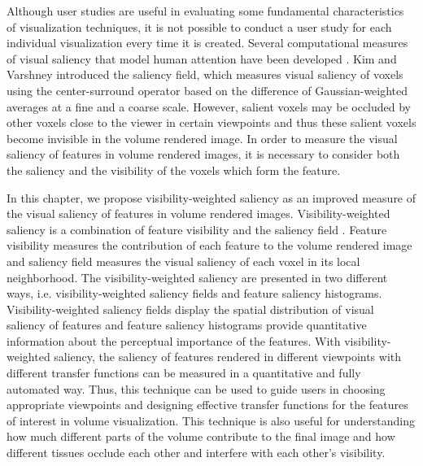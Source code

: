Although user studies are useful in evaluating some fundamental characteristics of visualization techniques, it is not possible to conduct a user study for each individual visualization every time it is created.
Several computational measures of visual saliency that model human attention have been developed \cite{itti_model_1998} \cite{harel_graph-based_2006}.
Kim and Varshney \cite{kim_saliency-guided_2006} introduced the saliency field, which measures visual saliency of voxels using the center-surround operator based on the difference of Gaussian-weighted averages at a fine and a coarse scale.
However, salient voxels may be occluded by other voxels close to the viewer in certain viewpoints and thus these salient voxels become invisible in the volume rendered image. In order to measure the visual saliency of features in volume rendered images, it is necessary to consider both the saliency and the visibility of the voxels which form the feature.

In this chapter, we propose visibility-weighted saliency as an improved measure of the visual saliency of features in volume rendered images. Visibility-weighted saliency is a combination of feature visibility \cite{wang_efficient_2011} and the saliency field \cite{kim_saliency-guided_2006}.
Feature visibility measures the contribution of each feature to the volume rendered image and saliency field measures the visual saliency of each voxel in its local neighborhood.
The visibility-weighted saliency are presented in two different ways, i.e. visibility-weighted saliency fields and feature saliency histograms. Visibility-weighted saliency fields display the spatial distribution of visual saliency of features and feature saliency histograms provide quantitative information about the perceptual importance of the features.
With visibility-weighted saliency, the saliency of features rendered in different viewpoints with different transfer functions can be measured in a quantitative and fully automated way.
Thus, this technique can be used to guide users in choosing appropriate viewpoints and designing effective transfer functions for the features of interest in volume visualization.
This technique is also useful for understanding how much different parts of the volume contribute to the final image and how different tissues occlude each other and interfere with each other's visibility.

